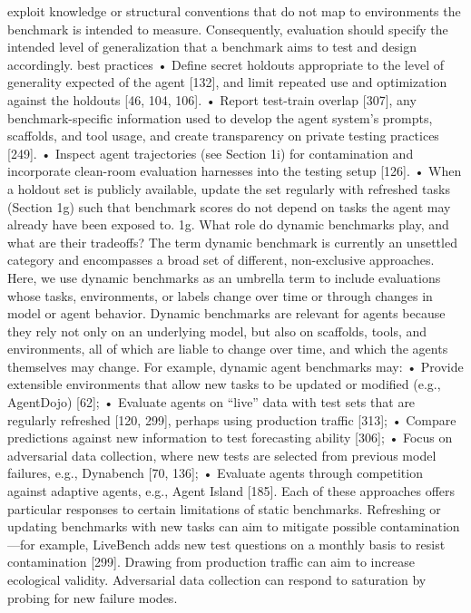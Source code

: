 exploit knowledge or structural conventions that do not map to environments the benchmark is intended
to measure. Consequently, evaluation should specify the intended level of generalization that a benchmark
aims to test and design accordingly.
best practices
• Define secret holdouts appropriate to the level of generality expected of the agent [132], and limit repeated
use and optimization against the holdouts [46, 104, 106].
• Report test-train overlap [307], any benchmark-specific information used to develop the agent system’s
prompts, scaffolds, and tool usage, and create transparency on private testing practices [249].
• Inspect agent trajectories (see Section 1i) for contamination and incorporate clean-room evaluation harnesses
into the testing setup [126].
• When a holdout set is publicly available, update the set regularly with refreshed tasks (Section 1g) such that
benchmark scores do not depend on tasks the agent may already have been exposed to.
1g. What role do dynamic benchmarks play, and what are their tradeoffs?
The term dynamic benchmark is currently an unsettled category and encompasses a broad set of different,
non-exclusive approaches. Here, we use dynamic benchmarks as an umbrella term to include evaluations
whose tasks, environments, or labels change over time or through changes in model or agent behavior.
Dynamic benchmarks are relevant for agents because they rely not only on an underlying model, but also
on scaffolds, tools, and environments, all of which are liable to change over time, and which the agents
themselves may change.
For example, dynamic agent benchmarks may:
• Provide extensible environments that allow new tasks to be updated or modified (e.g., AgentDojo) [62];
• Evaluate agents on “live” data with test sets that are regularly refreshed [120, 299], perhaps using
production traffic [313];
• Compare predictions against new information to test forecasting ability [306];
• Focus on adversarial data collection, where new tests are selected from previous model failures, e.g.,
Dynabench [70, 136];
• Evaluate agents through competition against adaptive agents, e.g., Agent Island [185].
Each of these approaches offers particular responses to certain limitations of static benchmarks. Refreshing
or updating benchmarks with new tasks can aim to mitigate possible contamination—for example, LiveBench
adds new test questions on a monthly basis to resist contamination [299]. Drawing from production traffic
can aim to increase ecological validity. Adversarial data collection can respond to saturation by probing for
new failure modes.
